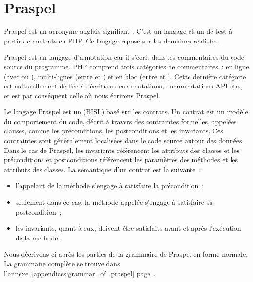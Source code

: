\def\gsep{$\quad::=\quad$}
\def\mvert{$\;\;|\;\;$}
\def\mvertp{\phantom{$\;\;|\;\;$}}
\newcommand{\gtoken}[1]{\underline{\code{php-#1}}}
\newcommand{\grule}[1]{\textit{#1}}

\section{Praspel}
\label{section:language:praspel}

Praspel est un acronyme anglais signifiant . C'est un langage et un 
de test à partir de contrats en PHP. Ce langage repose sur les domaines
réalistes.

Praspel est un {\strong langage d'annotation} car il s'écrit dans les
commentaires du code source du programme. PHP comprend trois catégories de
commentaires~: en ligne (avec \code{//} ou \code{\#}), multi-lignes (entre
\code{/*} et \code{*/}) et en bloc (entre \code{/**} et \code{*/}). Cette
dernière catégorie est culturellement dédiée à l'écriture des annotations,
documentations API etc., et est par conséquent celle où nous écrirons Praspel.

Le langage Praspel est un  ({\strong BISL}) basé sur les contrats. Un contrat est un modèle du
comportement du code, décrit à travers des contraintes formelles, appelées
clauses, comme les préconditions, les postconditions et les invariants. Ces
contraintes sont généralement localisées dans le code source autour des données.
Dans le cas de Praspel, les invariants référencent les attributs des classes et
les préconditions et postconditions référencent les paramètres des méthodes et
les attributs des classes. La sémantique d'un contrat est la suivante~:

\begin{itemize}

\item l'appelant de la méthode s'engage à satisfaire la précondition~;

\item seulement dans ce cas, la méthode appelée s'engage à satisfaire sa
postcondition~;

\item les invariants, quant à eux, doivent être satisfaits avant et après
l'exécution de la méthode.

\end{itemize}

Nous décrivons ci-après les parties de la grammaire de Praspel en forme normale.
La grammaire complète se trouve dans
l'annexe~\ref{appendices:grammar_of_praspel}
page~\pageref{appendices:grammar_of_praspel}.

